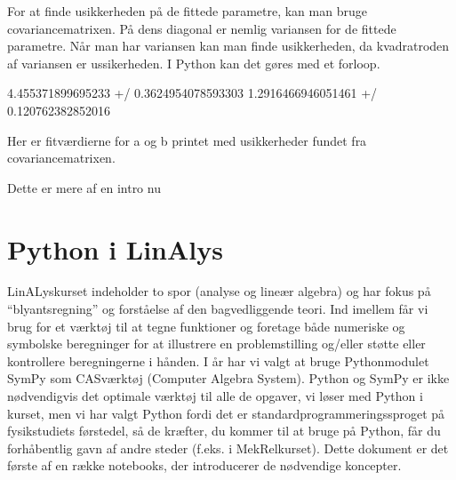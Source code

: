 \documentclass[letterpaper,10pt,english]{jupyterBook}
\begin{document}
\noindent{}

For at finde usikkerheden på de fittede parametre, kan man bruge covariance\sphinxhyphen{}matrixen. På dens diagonal er nemlig variansen for de fittede parametre. Når man har variansen kan man finde usikkerheden, da kvadratroden af variansen er ussikerheden. I Python kan det gøres med et for\sphinxhyphen{}loop.

\begin{sphinxVerbatim}[commandchars=\\\{\}]
   
      \PYG{p}{[}\PYG{p}{]}
    \PYG{p}{[}\PYG{p}{]}   
    
\end{sphinxVerbatim}

\begin{sphinxVerbatim}[commandchars=\\\{\}]
4.455371899695233  +/\PYGZhy{} 0.3624954078593303
1.2916466946051461  +/\PYGZhy{} 0.120762382852016
\end{sphinxVerbatim}

Her er fit\sphinxhyphen{}værdierne for a og b printet med usikkerheder fundet fra covariance\sphinxhyphen{}matrixen.

Dette er mere af en intro nu


\chapter{Python i LinAlys}
\label{\detokenize{notebooks/sympy/Notebook1:python-i-linalys}}\label{\detokenize{notebooks/sympy/Notebook1::doc}}
LinALys\sphinxhyphen{}kurset indeholder to spor (analyse og lineær algebra) og har fokus på “blyantsregning” og forståelse af den bagvedliggende teori. Ind imellem får vi brug for et værktøj til at tegne funktioner og foretage både numeriske og symbolske beregninger for at illustrere en problemstilling og/eller støtte eller kontrollere beregningerne i hånden. I år har vi valgt at bruge Python\sphinxhyphen{}modulet SymPy som CAS\sphinxhyphen{}værktøj (Computer Algebra System). Python og SymPy er ikke nødvendigvis det optimale værktøj til alle de opgaver, vi løser med Python i kurset, men vi har valgt Python fordi det er standardprogrammeringssproget på fysikstudiets førstedel, så de kræfter, du kommer til at bruge på Python, får du forhåbentlig gavn af andre steder (f.eks. i MekRel\sphinxhyphen{}kurset). Dette dokument er det første af en række notebooks, der introducerer de nødvendige koncepter.
\end{document}
